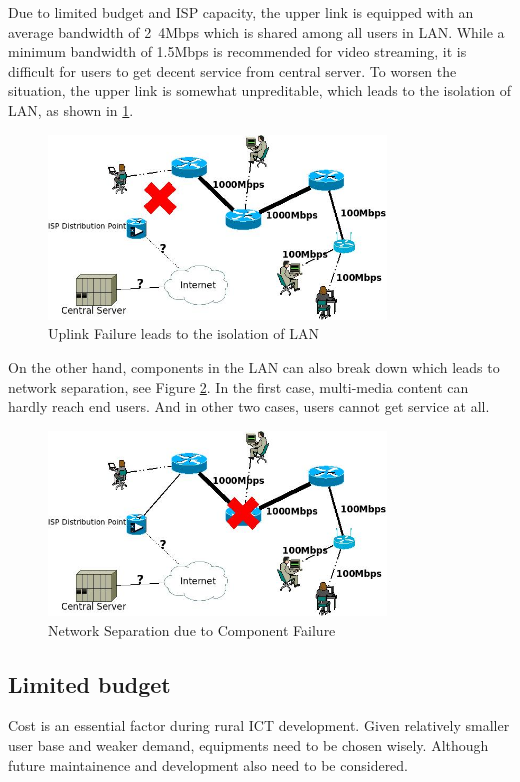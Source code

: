 Due to limited budget and ISP capacity, the upper link is equipped with an average bandwidth of 2~4Mbps which is shared among all users in LAN. While a minimum bandwidth of 1.5Mbps is recommended for video streaming, it is difficult for users to get decent service from central server.
To worsen the situation, the upper link is somewhat unpreditable, which leads to the isolation of LAN, as shown in \ref{uplink_break}.

\begin{figure}[htbp]
\centering
\includegraphics[width=0.8\textwidth]{../images/brief_diagram_of_sbn_network_upper_broken.jpeg}
\caption{Uplink Failure leads to the isolation of LAN}
\label{uplink_break}
\end{figure}

On the other hand, components in the LAN can also break down which leads to network separation, see Figure \ref{nata_break}. In the first case, multi-media content can hardly reach end users. And in other two cases, users cannot get service at all.

\begin{figure}[htbp]
\centering
\includegraphics[width=0.8\textwidth]{../images/brief_diagram_of_sbn_network_nata_broken.jpeg}
\caption{Network Separation due to Component Failure}
\label{nata_break}
\end{figure}

\subsection{Limited budget}
Cost is an essential factor during rural ICT development. Given relatively smaller user base and weaker demand, equipments need to be chosen wisely. Although future maintainence and development also need to be considered.